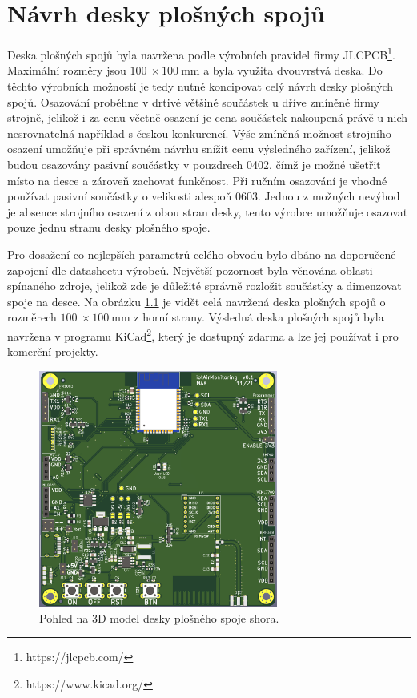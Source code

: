 \chapter{Návrh desky plošných spojů}

Deska plošných spojů byla navržena podle výrobních pravidel firmy JLCPCB\footnote{https://jlcpcb.com/}. Maximální rozměry jsou $\SI{100}{}\times \SI{100}{\milli\metre}$ a byla využita dvouvrstvá deska. Do těchto výrobních možností je tedy nutné koncipovat celý návrh desky plošných spojů. Osazování proběhne v drtivé většině součástek u dříve zmíněné firmy strojně, jelikož i za cenu včetně osazení je cena součástek nakoupená právě u nich nesrovnatelná například s českou konkurencí. Výše zmíněná možnost strojního osazení umožňuje při správném návrhu snížit cenu výsledného zařízení, jelikož budou osazovány pasivní součástky v pouzdrech 0402, čímž je možné ušetřit místo na desce a zároveň zachovat funkčnost. Při ručním osazování je vhodné používat pasivní součástky o velikosti alespoň 0603. Jednou z možných nevýhod je absence strojního osazení z obou stran desky, tento výrobce umožňuje osazovat pouze jednu stranu desky plošného spoje.

Pro dosažení co nejlepších parametrů celého obvodu bylo dbáno na doporučené zapojení dle datasheetu výrobců. Největší pozornost byla věnována oblasti spínaného zdroje, jelikož zde je důležité správně rozložit součástky a dimenzovat spoje na desce. Na obrázku \ref{fig_PCB-top} je vidět celá navržená deska plošných spojů o rozměrech $\SI{100}{}\times \SI{100}{\milli\metre}$ z horní strany. Výsledná deska plošných spojů byla navržena v programu KiCad\footnote{https://www.kicad.org/}, který je dostupný zdarma a lze jej používat i pro komerční projekty.

\begin{figure}[h]
    \centering
    \includegraphics[width=0.7\textwidth]{obrazky/PCB_top.png}
    \caption{Pohled na 3D model desky plošného spoje shora.}
    \label{fig_PCB-top}
\end{figure}